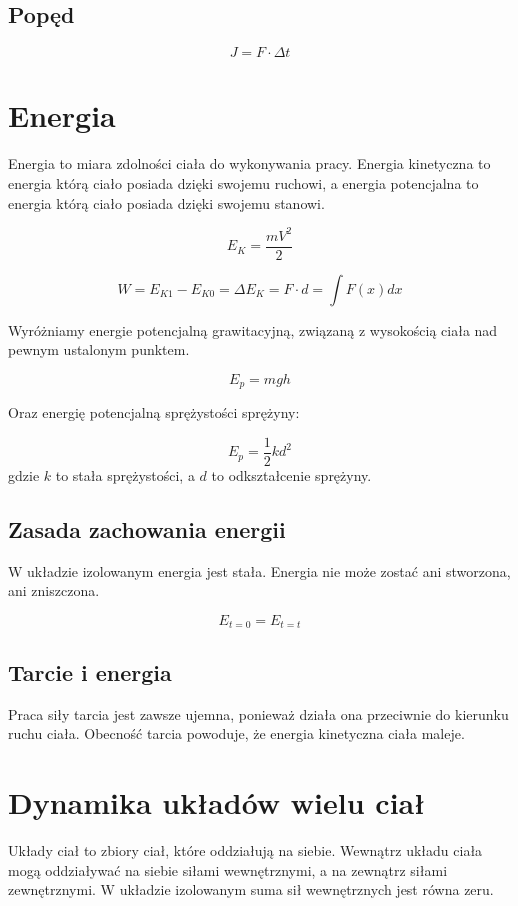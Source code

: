 \documentclass{../notatki}
\begin{document}
\subsection{Popęd}

$$
J = F \cdot \Delta t
$$

\section{Energia}

Energia to miara zdolności ciała do wykonywania pracy. Energia kinetyczna to
energia którą ciało posiada dzięki swojemu ruchowi, a energia potencjalna to
energia którą ciało posiada dzięki swojemu stanowi.

$$
E_K = \frac{mV^2}{2}
$$

$$
W = E_{K1} - E_{K0} = \Delta E_K = F \cdot d = \int F(x) dx
$$

Wyróżniamy energie potencjalną grawitacyjną, związaną z wysokością ciała nad
pewnym ustalonym punktem.

$$
E_p = mgh
$$

Oraz energię potencjalną sprężystości sprężyny:

$$
E_p = \frac{1}{2}kd^2
$$
gdzie $k$ to stała sprężystości, a $d$ to odkształcenie sprężyny.

\subsection{Zasada zachowania energii}

W układzie izolowanym energia jest stała. Energia nie może zostać ani stworzona,
ani zniszczona.

$$
E_{t=0} = E_{t=t}
$$

\subsection{Tarcie i energia}

Praca siły tarcia jest zawsze ujemna, ponieważ działa ona przeciwnie do kierunku
ruchu ciała. Obecność tarcia powoduje, że energia kinetyczna ciała maleje.

\section{Dynamika układów wielu ciał}

Układy ciał to zbiory ciał, które oddziałują na siebie. Wewnątrz układu ciała
mogą oddziaływać na siebie siłami wewnętrznymi, a na zewnątrz siłami
zewnętrznymi. W układzie izolowanym suma sił wewnętrznych jest równa zeru.
\end{document}
